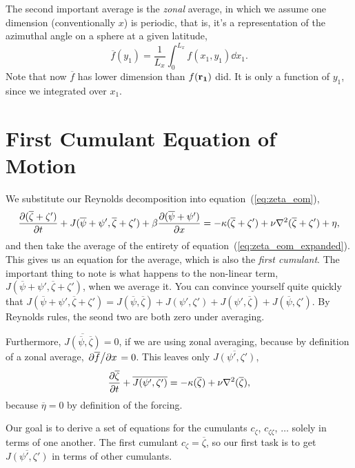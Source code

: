 \documentclass{paper}
\newcommand*{\reynolds}[1]{\mean{#1} + #1'}
\newcommand*{\mean}[1]{\overline{#1}}
\newcommand*{\zonal}[1]{\frac{1}{L_x} \int_0^{L_x} #1 \dd x_1}
\newcommand{\cz}{c_\zeta}
\newcommand{\czz}{c_{\zeta\zeta}}
\newcommand{\rr}[1]{\vb{r_{#1}}}
\begin{document}
The second important average is the \emph{zonal} average, in which we assume one dimension (conventionally $x$) is periodic, that is, it's a representation of the azimuthal angle on a sphere at a given latitude,
\begin{equation}
  \label{eq:zonal_average}
  \mean{f}(y_1) = \zonal{f(x_1, y_1)}. 
\end{equation}
Note that now $\mean{f}$ has lower dimension than $f(\rr1)$ did. It is only a function of $y_1$, since we integrated over $x_1$.

\section{First Cumulant Equation of Motion}
\label{sec:first-cumul-equat}

We substitute our Reynolds decomposition into equation~(\ref{eq:zeta_eom}),
\begin{equation}
  \label{eq:zeta_eom_expanded}
  \pdv{(\reynolds{\zeta})}{t} + J(\reynolds{\psi}, \reynolds{\zeta}) + \beta \pdv{(\reynolds{\psi})}{x} = -\kappa (\reynolds{\zeta}) + \nu \laplacian{(\reynolds{\zeta})} + \eta,
\end{equation}
and then take the average of the entirety of equation~(\ref{eq:zeta_eom_expanded}). This gives us an equation for the average, which is also the \emph{first cumulant}. The important thing to note is what happens to the non-linear term, $J(\reynolds{\psi}, \reynolds{\zeta})$, when we average it. You can convince yourself quite quickly that $J(\reynolds{\psi}, \reynolds{\zeta}) = J(\mean{\psi}, \mean{\zeta}) + J(\psi', \zeta') + J(\psi', \mean{\zeta}) + J(\mean{\psi}, \zeta')$. By Reynolds rules, the seond two are both zero under averaging.

Furthermore, $\mean{J(\mean{\psi}, \mean{\zeta})} = 0$, if we are using zonal averaging, because by definition of a zonal average, $\pdv*{\mean{f}}{x} = 0$. This leaves only $\mean{J(\psi', \zeta')}$,
% 
\begin{equation}
  \label{eq:zeta_first_c}
  \pdv{\mean{\zeta}}{t} + \mean{J(\psi', \zeta')}  = -\kappa (\mean{\zeta}) + \nu \laplacian{(\mean{\zeta})},
\end{equation}
because $\mean{\eta} = 0$ by definition of the forcing.

Our goal is to derive a set of equations for the cumulants $\cz$, $\czz$, $\ldots$ solely in terms of one another. The first cumulant $\cz = \mean{\zeta}$, so our first task is to get $\mean{J(\psi', \zeta')}$ in terms of other cumulants.
\end{document}
